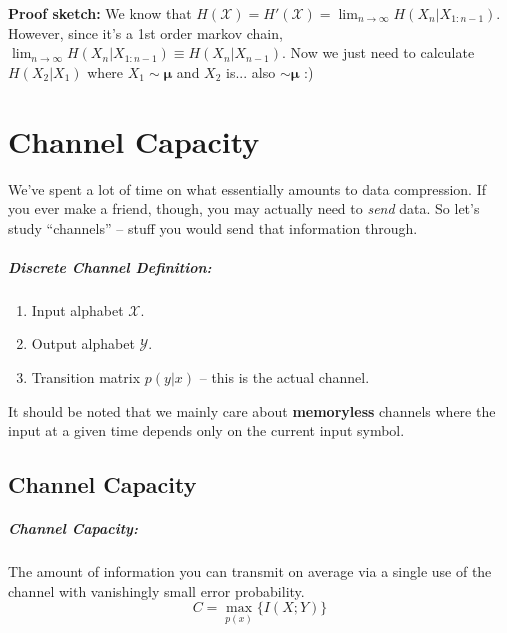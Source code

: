 \documentclass[a4paper,12pt]{report}
\begin{document}
\textbf{Proof sketch:} We know that $H(\mathcal X) = H'(\mathcal X) =
\lim_{n\to\infty} H(X_n | X_{1:n-1})$. However, since it's a 1st order markov
chain, $\lim_{n\to\infty} H(X_n | X_{1:n-1}) \equiv H(X_n | X_{n-1})$. Now we
just need to calculate $H(X_2 | X_1)$ where $X_1 \sim \mathbf \mu$ and $X_2$
is... also $\sim \mathbf \mu$ :)


























\chapter{Channel Capacity}

We've spent a lot of time on what essentially amounts to data compression. If
you ever make a friend, though, you may actually need to \textit{send} data. So
let's study ``channels'' -- stuff you would send that information through.

\paragraph{Discrete Channel Definition: } 
\begin{enumerate}
\item Input alphabet $\mathcal X$. 
\item Output alphabet $\mathcal Y$.
\item Transition matrix $p(y | x)$ -- this is the actual channel. 
\end{enumerate}

It should be noted that we mainly care about \textbf{memoryless} channels where
the input at a given time depends only on the current input symbol. 


\section{Channel Capacity} 

\paragraph{Channel Capacity: } The amount of information you can transmit on
average via a single use of the channel with vanishingly small error
probability.
\begin{equation}
	C = \max_{p(x)}\{I(X; Y)\}
\end{equation}
\end{document}
